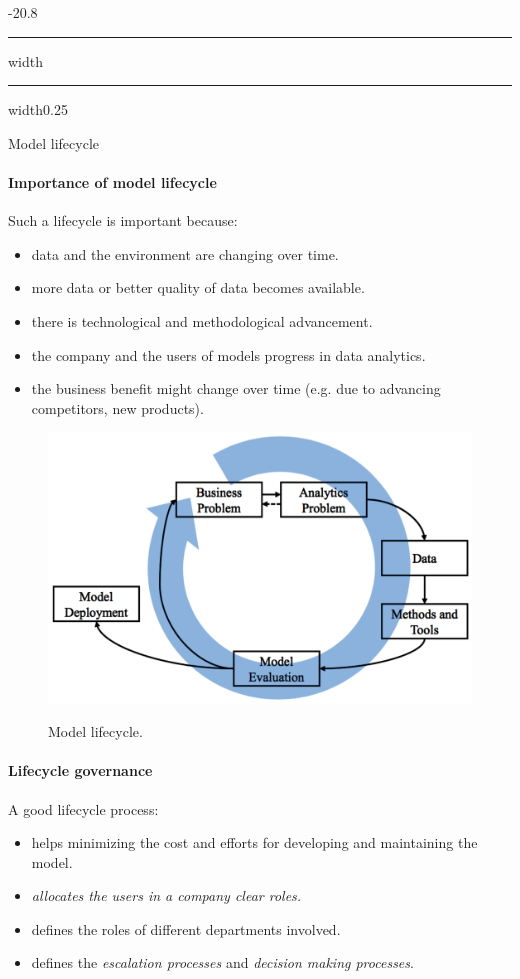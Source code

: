 \documentclass[a4paper, landscape, 6pt, fleqn]{scrartcl}
\makeatletter
\renewcommand{\section}{\@startsection{section}{1}{0mm}%
{-2\baselineskip}{0.8\baselineskip}%
{\hrule depth 0.2pt width\columnwidth\hrule depth1.5pt
width0.25\columnwidth\vspace*{1.2em}\Large\bfseries}}
\makeatother
\begin{document}
\begin{multicols*}{4}
\section{Model lifecycle}

\paragraph{Importance of model lifecycle}

Such a lifecycle is important because:
\begin{itemize}
\item data and the environment are changing over time.
\item more data or better quality of data becomes available.
\item there is technological and methodological advancement.
\item the company and the users of models progress in data analytics.
\item the business benefit might change over time (e.g. due to advancing competitors, new products).
\end{itemize}

\begin{figure}[H]
\centering
\includegraphics[width=1.05 \linewidth]{ModelLifecycle}
\label{fig:ModelLifecycle}
\caption{Model lifecycle.}
\end{figure}

\paragraph{Lifecycle governance}

A good lifecycle process:
\begin{itemize}
\item helps minimizing the cost and efforts for developing and maintaining the model.
\item \textit{allocates the users in a company clear roles.}
\item defines the roles of different departments involved.
\item defines the \textit{escalation processes} and \textit{decision making processes}.
\end{itemize}


\end{multicols*}
\end{document}

